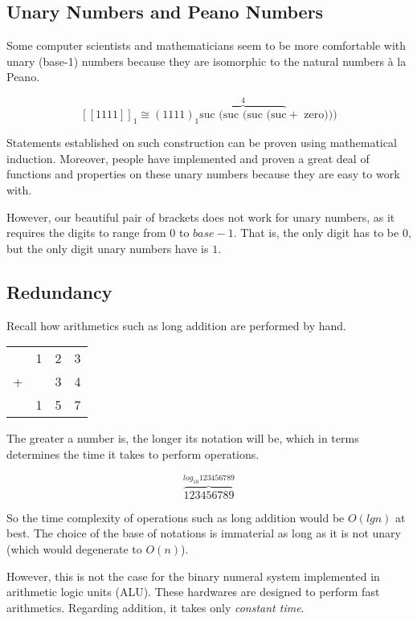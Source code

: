 \documentclass[../thesis.tex]{subfiles}
\begin{document}
\subsection{Unary Numbers and Peano Numbers}

Some computer scientists and mathematicians seem to be more comfortable with
unary (base-1) numbers because they are isomorphic to the natural numbers à la Peano.

$$
    [\![1111]\!]_{1} \cong
    (1111)_{1}
        \overbrace{\text{suc (suc (suc (suc}}^4 + \text{ zero)))}
$$

Statements established on such construction can be proven using mathematical
induction. Moreover, people have implemented and proven a great deal of functions
and properties on these unary numbers because they are easy to work with.

However, our beautiful pair of brackets does not work for unary numbers,
as it requires the digits to range from $ 0 $ to $ base - 1 $.
That is, the only digit has to be $ 0 $, but the only digit unary numbers have is $ 1 $.

\subsection{Redundancy}

Recall how arithmetics such as long addition are performed by hand.

\begin{center}
    \begin{tabular}{c@{\,}c@{\,}c@{\,}c}
      & 1 & 2 & 3 \\
    + &   & 3 & 4 \\
    \hline
      & 1 & 5 & 7 \\
    \end{tabular}
\end{center}

The greater a number is, the longer its notation will be, which in terms
determines the time it takes to perform operations.

$$
    \overbrace{\text{123456789}}^{log_{10} 123456789}
$$

So the time complexity of operations such as long addition would be $ O(lg n) $
at best. The choice of the base of notations is immaterial as long as it is not
unary (which would degenerate to $ O(n) $).

However, this is not the case for the binary numeral system implemented in
arithmetic logic units (ALU). These hardwares are designed to perform fast
arithmetics. Regarding addition, it takes only \textit{constant time}.
\end{document}
